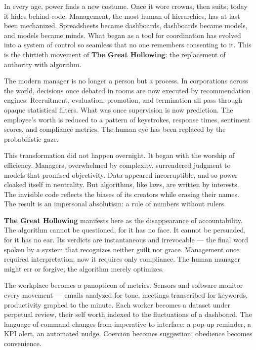 \documentclass[11pt,twoside]{book}
\begin{document}
In every age, power finds a new costume.  
Once it wore crowns, then suits; today it hides behind code.  
Management, the most human of hierarchies, has at last been mechanized.  
Spreadsheets became dashboards, dashboards became models, and models became minds.  
What began as a tool for coordination has evolved into a system of control so seamless that no one remembers consenting to it.  
This is the thirtieth movement of \textbf{The Great Hollowing}: the replacement of authority with algorithm.

\bigskip

The modern manager is no longer a person but a process.  
In corporations across the world, decisions once debated in rooms are now executed by recommendation engines.  
Recruitment, evaluation, promotion, and termination all pass through opaque statistical filters.  
What was once supervision is now prediction.  
The employee’s worth is reduced to a pattern of keystrokes, response times, sentiment scores, and compliance metrics.  
The human eye has been replaced by the probabilistic gaze.

This transformation did not happen overnight.  
It began with the worship of efficiency.  
Managers, overwhelmed by complexity, surrendered judgment to models that promised objectivity.  
Data appeared incorruptible, and so power cloaked itself in neutrality.  
But algorithms, like laws, are written by interests.  
The invisible code reflects the biases of its creators while erasing their names.  
The result is an impersonal absolutism: a rule of numbers without rulers.

\textbf{The Great Hollowing} manifests here as the disappearance of accountability.  
The algorithm cannot be questioned, for it has no face.  
It cannot be persuaded, for it has no ear.  
Its verdicts are instantaneous and irrevocable — the final word spoken by a system that recognizes neither guilt nor grace.  
Management once required interpretation; now it requires only compliance.  
The human manager might err or forgive; the algorithm merely optimizes.

The workplace becomes a panopticon of metrics.  
Sensors and software monitor every movement — emails analyzed for tone, meetings transcribed for keywords, productivity graphed to the minute.  
Each worker becomes a dataset under perpetual review, their self worth indexed to the fluctuations of a dashboard.  
The language of command changes from imperative to interface: a pop-up reminder, a KPI alert, an automated nudge.  
Coercion becomes suggestion; obedience becomes convenience.
\end{document}
